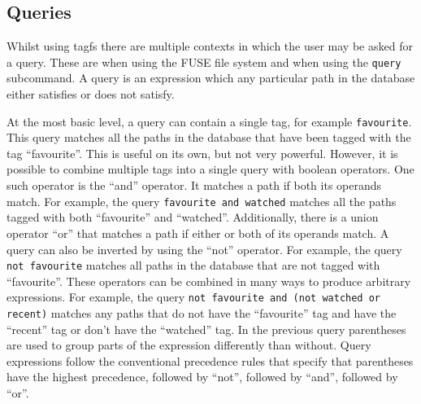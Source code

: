 
\subsection{Queries}
\label{sec:queries}

Whilst using tagfs there are multiple contexts in which the user may be asked
for a query. These are when using the FUSE file system and when using the
\texttt{query} subcommand. A query is an expression which any particular path
in the database either satisfies or does not satisfy.

At the most basic level, a query can contain a single tag, for example
\texttt{favourite}. This query matches all the paths in the database that have
been tagged with the tag ``favourite''. This is useful on its own, but not very
powerful. However, it is possible to combine multiple tags into a single query
with boolean operators. One such operator is the ``and'' operator. It matches a
path if both its operands match. For example, the query \texttt{favourite and
watched} matches all the paths tagged with both ``favourite'' and ``watched''.
Additionally, there is a union operator ``or'' that matches a path if either or
both of its operands match. A query can also be inverted by using the ``not''
operator. For example, the query \texttt{not favourite} matches all paths in
the database that are not tagged with ``favourite''. These operators can be
combined in many ways to produce arbitrary expressions. For example, the
query \texttt{not favourite and (not watched or recent)} matches any paths that
do not have the ``favourite'' tag and have the ``recent'' tag or don't have the
``watched'' tag. In the previous query parentheses are used to group parts of
the expression differently than without. Query expressions follow the
conventional precedence rules that specify that parentheses have the highest
precedence, followed by ``not'', followed by ``and'', followed by ``or''.


